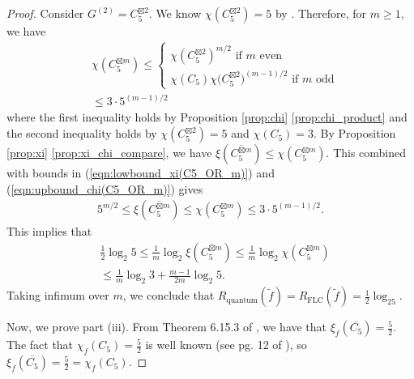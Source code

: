 \documentclass[journal, onecolumn, draftcls]{IEEEtran}
\theoremstyle{definition}
\newcommand{\meng}[1]{\marginpar{+}{\bf Ruoyu's remark}: {\em #1}}
\begin{document}
\begin{proof}
Consider $G^{(2)} = C_5^{\boxtimes 2}$. We know $\chi( C_5^{\boxtimes 2})=5$ by \cite{Witsenhausen_76}. Therefore, for $m\ge 1$, we have 
\begin{equation}\label{eqn:upbound_chi(C5_OR_m)}
\begin{split}
        &\chi({C_5^{\boxtimes m}}) \le
        \begin{cases}
          \chi({C_5^{\boxtimes 2}})^{m/2}\text{ if }m\text{ even}\\
        \chi(C_5)\chi({C_5^{\boxtimes 2})^{(m-1)/2}}\text{ if }m\text{ odd}
        \end{cases}
        \\ 
        &\le 3\cdot 5^{(m-1)/2}
\end{split}
\end{equation}
where the first inequality holds by Proposition 
\ref{prop:chi} \ref{prop:chi_product} and the second inequality holds by $\chi(C_5^{\boxtimes 2}) =5$ and $\chi(C_5)=3$. By Proposition \ref{prop:xi} \ref{prop:xi_chi_compare}, we have $\xi(\overline{C_5^{\boxtimes m}})\le \chi({C_5^{\boxtimes m}})$. This combined with bounds in (\ref{eqn:lowbound_xi(C5_OR_m)}) and (\ref{eqn:upbound_chi(C5_OR_m)})  gives  
\begin{align*} 
   {5^{m/2}} \le  \xi(\overline{C_5^{\boxtimes m}}) \le  \chi({C_5^{\boxtimes m}})\le 3\cdot 5^{(m-1)/2}.
\end{align*} 
This implies that
\begin{align*} 
 & \frac{1}{2}\log_2 {5} \le    \frac{1}{m}
\log_2 \xi(\overline{C_5^{\boxtimes m}})\le \frac{1}{m}
\log_2 \chi({C_5^{\boxtimes m}}) \\ & 
 \le  \frac{1}{m} \log_2 3 + \frac{m-1}{2m}\log_2 5.
\end{align*}
Taking infimum over $m$, we conclude that $R_{\text{quantum}}(\tilde f) = R_{\text{FLC}}(\tilde f) =\frac{1}{2}\log_25$.

Now, we prove part (iii). From Theorem 6.15.3 of \cite{Roberson_13}, we have that $\xi_f(\overline{C_5}) = \frac{5}{2}$. The fact that $ \chi_f(C_5) = \frac{5}{2}$ is well known (see pg. 12 of \cite{ScheinermanU97FGT}), so $\xi_f(\overline{C_5})=\frac{5}{2} = \chi_f(C_5).$


\end{proof}
\end{document}
